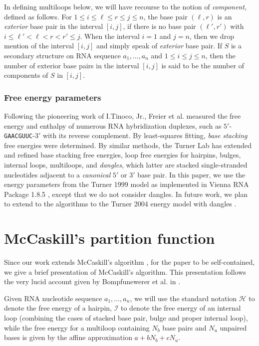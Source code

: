 In defining multiloops below, we will
have recourse to the notion of {\em component}, defined as follows.
For $1 \leq i \leq \ell \leq r \leq j \leq n$, the base pair $(\ell,r)$
is an {\em exterior} base pair in the interval $[i,j]$, if there is no
base pair $(\ell',r')$ with $i \leq \ell'<\ell < r < r' \leq j$.
When the interval $i=1$ and $j=n$, then we drop mention of the interval
$[i,j]$ and simply speak of {\em exterior} base pair.
If $S$ is a secondary structure on RNA sequence $a_1,\ldots,a_n$ and
$1 \leq i\leq j \leq n$, then the number of exterior base pairs in
the interval $[i,j]$ is said to be the number of components of $S$ in $[i,j]$.

\subsubsection*{Free energy parameters}
Following the pioneering work of I.Tinoco, Jr.,
Freier et al. \citep{Freier.pnas86} measured the free energy and
enthalpy of numerous RNA hybridization duplexes, such as
$5'$-{\tt GAACGUUC}-$3'$ with its reverse complement. By least-squares
fitting, {\em base stacking} free energies were determined. By similar
methods, the Turner Lab \citep{turner,xia:RNA}
has extended and refined base stacking free energies,
loop free energies for hairpins, bulges, internal loops, multiloops, and
{\em dangles}, which latter are
stacked single-stranded nucleotides adjacent to a
{\em canonical} $5'$ or $3'$ base pair. In this paper, we use the
energy parameters from the Turner 1999 model \citep{turner,xia:RNA}
as implemented in Vienna RNA Package 1.8.5
\citep{hofacker:ViennaWebServer}, except that we do not consider
dangles. In future work, we plan to extend to the algorithms to
the Turner 2004 energy model with dangles \citep{Turner.nar09}.

\section{McCaskill's partition function}
\label{section:McCaskill}

Since our work extends McCaskill's algorithm \citep{mcCaskill}, for the
paper to be self-contained, we give a brief presentation
of McCaskill's algorithm. This presentation follows the very lucid
account given by Bompfunewerer et al.  in \citep{Bompfunewerer.jmb08}.

Given RNA nucleotide sequence $a_1,\ldots,a_n$, we will use the standard
notation $\mathcal{H}$ to denote the free energy of a hairpin,
$\mathcal{I}$ to denote the free energy of an internal loop
(combining the cases of stacked base pair, bulge and proper internal
loop), while the
free energy for a multiloop containing $N_b$ base pairs and $N_u$ unpaired
bases is given by the affine approximation $a+bN_b+cN_u$.

